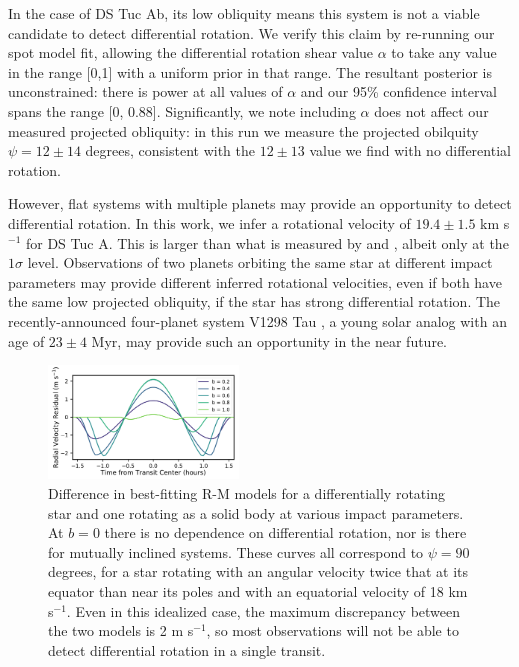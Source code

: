 \documentclass[twocolumn]{aastex63}
\begin{document}
In the case of DS Tuc Ab, its low obliquity means this system is not a viable candidate to detect differential rotation. 
We verify this claim by re-running our spot model fit, allowing the differential rotation shear value $\alpha$ to take any value in the range [0,1] with a uniform prior in that range. 
The resultant posterior is unconstrained: there is power at all values of $\alpha$ and our 95\% confidence interval spans the range [0, 0.88]. 
Significantly, we note including $\alpha$ does not affect our measured projected obliquity: in this run we measure the projected obilquity $\psi = 12 \pm 14$ degrees, consistent with the $12 \pm 13$ value we find with no differential rotation.

However, flat systems with multiple planets may provide an opportunity to detect differential rotation.
In this work, we infer a rotational velocity of $19.4 \pm 1.5$ km s$^{-1}$ for DS Tuc A.
This is larger than what is measured by \citet{Benatti19} and \citet{Newton19}, albeit only at the $1\sigma$ level.
Observations of two planets orbiting the same star at different impact parameters may provide different inferred rotational velocities, even if both have the same low projected obliquity, if the star has strong differential rotation.
The recently-announced four-planet system V1298 Tau \citep{David19}, a young solar analog with an age of $23 \pm 4$ Myr, may provide such an opportunity in the near future.



\begin{figure}[!tbh]
  \begin{center}
    \includegraphics[width=0.45\textwidth, trim={0cm 0.0cm 0cm 0cm}, clip=true]{../figures/diff_rot.pdf}
   \end{center}
  \caption{Difference in best-fitting R-M models for a differentially rotating star and one rotating as a solid body at various impact parameters. At $b=0$ there is no dependence on differential rotation, nor is there for mutually inclined systems. These curves all correspond to $\psi = 90$ degrees, for a star rotating with an angular velocity twice that at its equator than near its poles and with an equatorial velocity of 18 km s$^{-1}$. Even in this idealized case, the maximum discrepancy between the two models is 2 m s$^{-1}$, so most observations will not be able to detect differential rotation in a single transit. }
  \label{fig:diff_rot}
\end{figure}
\end{document}
